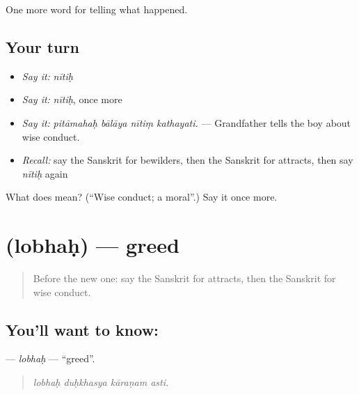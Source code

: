 \begin{grammarlens}[title={What you've built}]
One more word for telling what happened.
\end{grammarlens}

\subsection*{Your turn}
\begin{itemize}
\raggedright
  \item \emph{Say it:} \emph{nītiḥ}
  \item \emph{Say it:} \emph{nītiḥ}, once more
  \item \emph{Say it:} \emph{pitāmahaḥ bālāya nītiṃ kathayati.} — Grandfather tells the boy about wise conduct.
  \item \emph{Recall:} say the Sanskrit for bewilders, then the Sanskrit for attracts, then say \emph{nītiḥ} again
\end{itemize}

\begin{tcolorbox}[breakable,colback=teal!4,colframe=teal!35!black,title={Before you move on}]
What does  mean? (\textquotedblleft{}Wise conduct; a moral\textquotedblright{}.) Say it once more.
\end{tcolorbox}
\section[\texorpdfstring{\sk{लोभः} (lobhaḥ)}{लोभः (lobhaḥ)}]{ (lobhaḥ) — greed}

\label{lesson:SA-C336-lobhah}



\begin{quote}
Before the new one: say the Sanskrit for attracts, then the Sanskrit for wise conduct.
\end{quote}

\subsection*{You'll want to know: }
\textbf{} — \emph{lobhaḥ} — \textquotedblleft{}greed\textquotedblright{}.

\begin{quote}
   
\end{quote}

\begin{quote}
\emph{lobhaḥ duḥkhasya kāraṇam asti.}
\end{quote}

